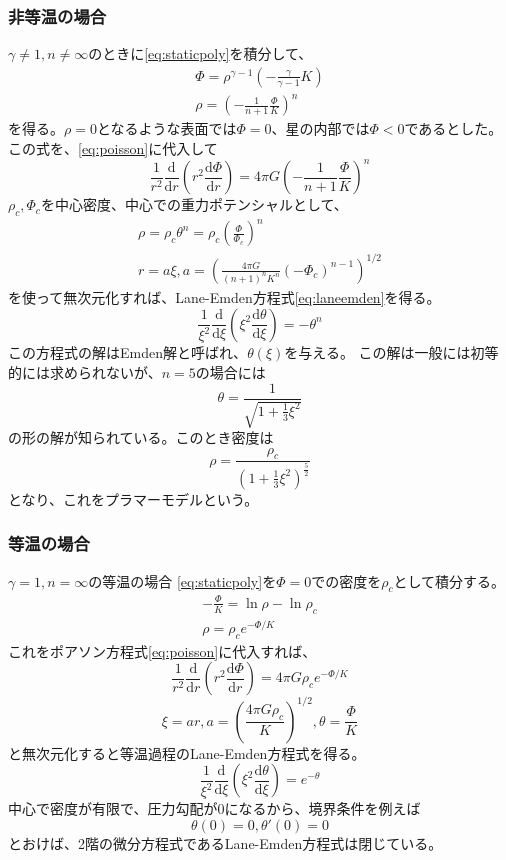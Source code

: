 \documentclass[a4j, dvipdfmx]{jsarticle}
\newcommand{\dder}[2][]{\frac{\mathrm{d}#1}{\mathrm{d}#2}}
\newcommand{\beq}{\begin{equation}}
\newcommand{\eeq}{\end{equation}}
\begin{document}
\subsubsection{非等温の場合}
$\gamma \neq 1, n\neq \infty$のときに\eqref{eq:staticpoly}を積分して、
\begin{align}
    \Phi = \rho^{\gamma -1} (- \frac{\gamma}{\gamma -1}K)\\
    \rho = \left(- \frac{1}{n+1}\frac{\Phi}{K}\right)^n
\end{align}
を得る。$\rho =0$となるような表面では$\Phi=0$、星の内部では$\Phi < 0$であるとした。
この式を、\eqref{eq:poisson}に代入して
\begin{equation}
    \frac{1}{r^2}\dder[]{r}(r^2\dder[\Phi]{r}) = 4\pi G\left(- \frac{1}{n+1}\frac{\Phi}{K}\right)^n
\end{equation}
$\rho_c,\Phi_c$を中心密度、中心での重力ポテンシャルとして、
\begin{align}
    \rho = \rho_c \theta^n = \rho_c (\frac{\Phi}{\Phi_c})^n\\
r = a\xi, a = \left(\frac{4\pi G}{(n+1)^n K^n}(-\Phi_c)^{n-1}\right)^{1/2}
\end{align}
を使って無次元化すれば、Lane-Emden方程式\eqref{eq:laneemden}を得る。
\begin{equation}
    \frac{1}{\xi^2}\dder[]{\xi}\left(\xi^2\dder[\theta]{\xi}\right) = - \theta^n\label{eq:laneemden}
\end{equation}
この方程式の解はEmden解と呼ばれ、$\theta(\xi)$を与える。
この解は一般には初等的には求められないが、$n=5$の場合には
\beq
\theta = \frac{1}{\sqrt{1 + \frac{1}{3}\xi^2}}
\eeq
の形の解が知られている。このとき密度は
\beq
\rho =  \frac{\rho_c}{(1 + \frac{1}{3}\xi^2)^\frac{5}{2}}
\eeq
となり、これをプラマーモデルという。
\subsubsection{等温の場合}
$\gamma=1,n=\infty$の等温の場合
\eqref{eq:staticpoly}を$\Phi=0$での密度を$\rho_c$として積分する。
\begin{align}
    - \frac{\Phi}{K} = \ln \rho - \ln \rho_c\\
    \rho = \rho_ce^{-\Phi/K}
\end{align}
これをポアソン方程式\eqref{eq:poisson}に代入すれば、
\begin{equation}
    \frac{1}{r^2}\dder[]{r}(r^2\dder[\Phi]{r}) = 4\pi G\rho_c e^{-\Phi/K}
\end{equation}
\begin{equation}
    \xi = ar, a = \left( \frac{4\pi G \rho_c}{K}\right)^{1/2}, \theta = \frac{\Phi}{K}
\end{equation}
と無次元化すると等温過程のLane-Emden方程式を得る。
\begin{equation}
    \frac{1}{\xi^2}\dder[]{\xi}\left(\xi^2\dder[\theta]{\xi}\right) = e^{-\theta}
\end{equation}
中心で密度が有限で、圧力勾配が$0$になるから、境界条件を例えば
\begin{equation}
    \theta(0) = 0,    \theta'(0) = 0
\end{equation}
とおけば、2階の微分方程式であるLane-Emden方程式は閉じている。
\end{document}
